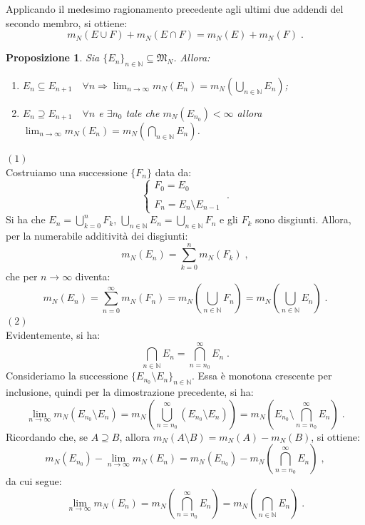 \documentclass[a4paper,12pt]{report}
\theoremstyle{plain}
\newtheorem{prop}{Proposizione}[section]
\theoremstyle{definition}
\theoremstyle{remark}
\numberwithin{equation}{section}
\begin{document}
Applicando il medesimo ragionamento precedente agli ultimi due addendi del secondo membro, si ottiene:
\begin{equation}
m_N(E\cup F)+m_N(E\cap F)=m_N(E)+m_N(F)\;.
\end{equation}
\endproof
\begin{prop} Sia $\{E_n\}_{n \in \mathbb{N}} \subseteq \mathfrak{M}_N$. Allora:
\begin{enumerate}
 \item $E_n \subseteq E_{n+1} \quad \forall n \Longrightarrow \lim_{n\to \infty} m_N(E_n)=m_N\left(\bigcup_{n \in \mathbb{N}} E_n\right)$;
 \item $E_n \supseteq E_{n+1} \quad \forall n$ e $\exists n_0$ tale che $m_N(E_{n_0})<\infty$ allora $\lim_{n\to \infty} m_N(E_n)=
m_N\left(\bigcap_{n\in \mathbb{N}} E_n\right)$.
\end{enumerate}
\end{prop}
\proof $(1)$ \\

Costruiamo una successione $\{F_n\}$ data da:
\begin{equation}
\begin{cases}
 F_0=E_0 \\
\\
F_n=E_n\setminus E_{n-1}
\end{cases}\;.
\end{equation}
Si ha che $E_n=\bigcup_{k=0}^n F_k$, $\bigcup_{n \in \mathbb{N}} E_n=\bigcup_{n \in \mathbb{N}} F_n$ e gli $F_k$ sono disgiunti. Allora, 
per la numerabile additività dei disgiunti:
\begin{equation}
m_N(E_n)=\sum_{k=0}^n m_N(F_k)\;,
\end{equation}
che per $n \to \infty$ diventa:
\begin{equation}
m_N(E_n)=\sum_{n=0}^{\infty} m_N(F_n)=m_N\left(\bigcup_{n\in \mathbb{N}} F_n \right)=m_N\left(\bigcup_{n\in\mathbb{N}} E_n\right)\;.
\end{equation}
\endproof
\proof $(2)$ \\

Evidentemente, si ha:
\begin{equation}
\bigcap_{n\in \mathbb{N}} E_n=\bigcap_{n=n_0}^{\infty} E_n\;.
\end{equation}
Consideriamo la successione $\{E_{n_0}\setminus E_n\}_{n \in \mathbb{N}}$. Essa è monotona crescente per inclusione, quindi per la 
dimostrazione precedente, si ha:
\begin{equation}
\lim_{n \to \infty} m_N(E_{n_0}\setminus E_n)=m_N\left(\bigcup_{n=n_0}^{\infty} (E_{n_0}\setminus E_n)\right)=m_N\left(E_{n_0}\setminus
\bigcap_{n=n_0}^{\infty} E_n \right)\;.
\end{equation}
Ricordando che, se $A\supseteq B$, allora $m_N(A\setminus B)=m_N(A)-m_N(B)$, si ottiene:
\begin{equation}
m_N(E_{n_0})-\lim_{n\to \infty} m_N(E_n)=m_N(E_{n_0})-m_N\left(\bigcap_{n=n_0}^{\infty} E_n\right)\;,
\end{equation}
da cui segue:
\begin{equation}
\lim_{n\to\infty}m_N(E_n)=m_N\left(\bigcap_{n=n_0}^{\infty} E_n\right)=m_N\left(\bigcap_{n\in\mathbb{N}} E_n\right)\;.
\end{equation}
\endproof
\end{document}
